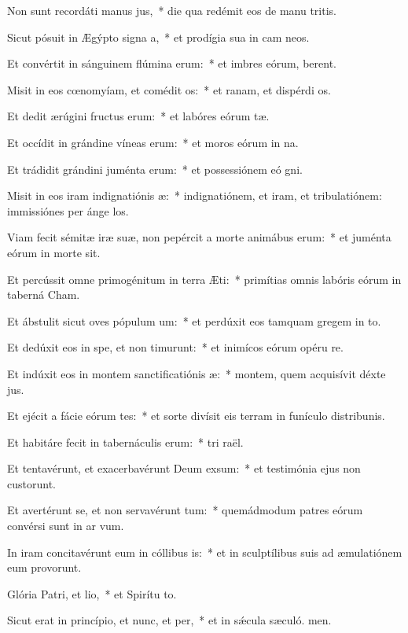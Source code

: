\item Non sunt recordáti manus jus,~* die qua redémit eos de manu tritis.
\item Sicut pósuit in Ægýpto signa a,~* et prodígia sua in cam neos.
\item Et convértit in sánguinem flúmina erum:~* et imbres eórum,  berent.
\item Misit in eos cœnomyíam, et comédit os:~* et ranam, et dispérdi os.
\item Et dedit ærúgini fructus erum:~* et labóres eórum tæ.
\item Et occídit in grándine víneas erum:~* et moros eórum in na.
\item Et trádidit grándini juménta erum:~* et possessiónem eó gni.
\item Misit in eos iram indignatiónis æ:~* indignatiónem, et iram, et tribulatiónem: immissiónes per ánge los.
\item Viam fecit sémitæ iræ suæ, non pepércit a morte animábus erum:~* et juménta eórum in morte sit.
\item Et percússit omne primogénitum in terra Æti:~* primítias omnis labóris eórum in taberná Cham.
\item Et ábstulit sicut oves pópulum um:~* et perdúxit eos tamquam gregem in to.
\item Et dedúxit eos in spe, et non timurunt:~* et inimícos eórum opéru re.
\item Et indúxit eos in montem sanctificatiónis æ:~* montem, quem acquisívit déxte jus.
\item Et ejécit a fácie eórum tes:~* et sorte divísit eis terram in funículo distribunis.
\item Et habitáre fecit in tabernáculis erum:~* tri raël.
\item Et tentavérunt, et exacerbavérunt Deum exsum:~* et testimónia ejus non custorunt.
\item Et avertérunt se, et non servavérunt tum:~* quemádmodum patres eórum convérsi sunt in ar vum.
\item In iram concitavérunt eum in cóllibus is:~* et in sculptílibus suis ad æmulatiónem eum provorunt.
\item Glória Patri, et lio,~* et Spirítu to.
\item Sicut erat in princípio, et nunc, et per,~* et in sǽcula sæculó. men.
